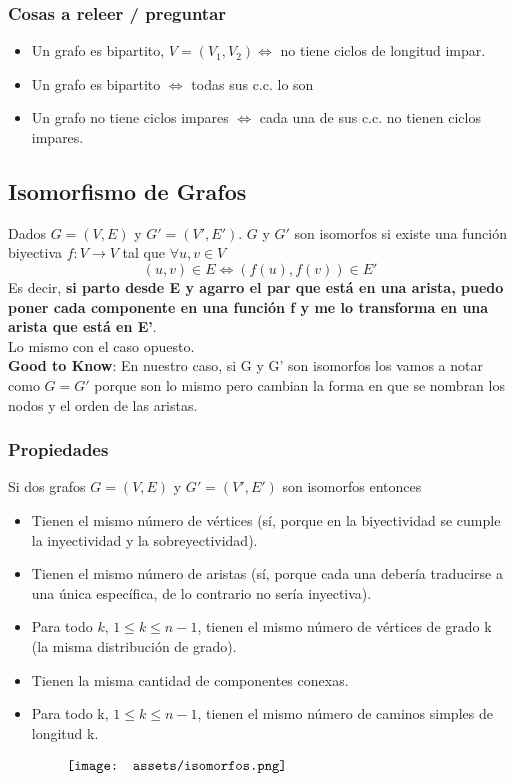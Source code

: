 \documentclass[10pt,a4paper]{article}
\begin{document}
\subsubsection*{Cosas a releer / preguntar}
\begin{itemize}
    \item Un grafo es bipartito, $V = (V_{1}, V_{2}) \iff$ no tiene ciclos de longitud impar.
    \item Un grafo es bipartito $\iff$ todas sus c.c. lo son 
    \item Un grafo no tiene ciclos impares $\iff$ cada una de sus c.c. no tienen ciclos impares.
\end{itemize}
\subsection*{Isomorfismo de Grafos}
Dados  $G = (V, E)$ y $G' = (V', E')$. $G$ y $G'$ son isomorfos si existe una función biyectiva $f: V \rightarrow V$ tal que $\forall u,v \in V$ 
\[(u,v) \in E \iff (f(u), f(v)) \in E'\]
Es decir, \textbf{si parto desde E y agarro el par que está en una arista, puedo poner cada componente en una función f y me lo transforma en una arista que está en E'}. \\
Lo mismo con el caso opuesto. \\
\textbf{Good to Know}: En nuestro caso, si G y G' son isomorfos los vamos a notar como $G = G'$ porque son lo mismo pero cambian la forma en que se nombran los nodos y el orden de las aristas.
\subsubsection*{Propiedades}
Si dos grafos $G = (V,E)$ y $G' = (V', E')$ son isomorfos entonces
\begin{itemize}
    \item Tienen el mismo número de vértices (sí, porque en la biyectividad se cumple la inyectividad y la sobreyectividad).
    \item Tienen el mismo número de aristas (sí, porque cada una debería traducirse a una única específica, de lo contrario no sería inyectiva).
    \item Para todo $k$, $1 \le k \le n-1$, tienen el mismo número de vértices de grado k (la misma distribución de grado).
    \item Tienen la misma cantidad de componentes conexas.
    \item Para todo k, $1 \le k \le n-1$, tienen el mismo número de caminos simples de longitud k.
\end{itemize}
\[\begin{minipage}[b]{0.8\textwidth}
    \texttt{[image: assets/isomorfos.png]}
\end{minipage}\]
\end{document}
